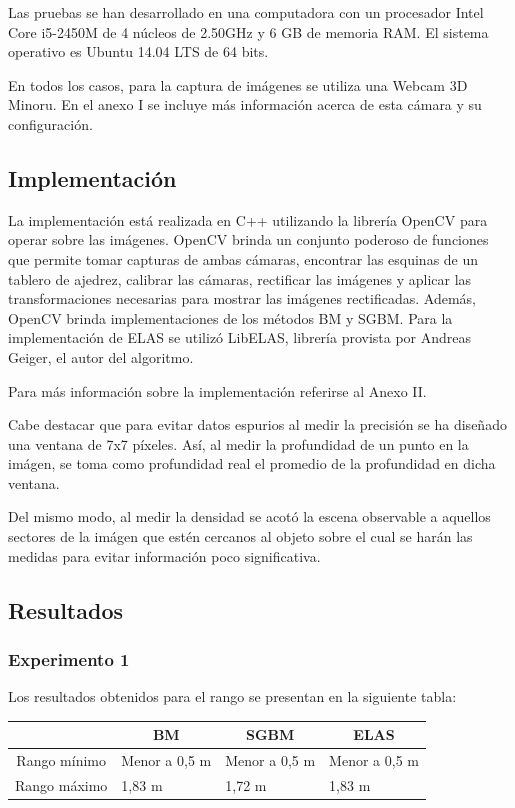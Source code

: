 \documentclass[11pt,a4paper,titlepage]{article}
\begin{document}
Las pruebas se han desarrollado en una computadora con un procesador Intel Core i5-2450M de 4 núcleos de 2.50GHz y 6 GB de memoria RAM. El sistema operativo es Ubuntu 14.04 LTS de 64 bits.

En todos los casos, para la captura de imágenes se utiliza una Webcam 3D Minoru. En el anexo I se incluye más información acerca de esta cámara y su configuración.

\subsection{Implementación}

La implementación está realizada en C++ utilizando la librería OpenCV para operar sobre las imágenes. OpenCV brinda un conjunto poderoso de funciones que permite tomar capturas de ambas cámaras, encontrar las esquinas de un tablero de ajedrez, calibrar las cámaras, rectificar las imágenes y aplicar las transformaciones necesarias para mostrar las imágenes rectificadas. Además, OpenCV brinda implementaciones de los métodos BM y SGBM. Para la implementación de ELAS se utilizó LibELAS, librería provista por Andreas Geiger, el autor del algoritmo.

Para más información sobre la implementación referirse al Anexo II.

Cabe destacar que para evitar datos espurios al medir la precisión se ha diseñado una ventana de 7x7 píxeles. Así, al medir la profundidad de un punto en la imágen, se toma como profundidad real el promedio de la profundidad en dicha ventana.

Del mismo modo, al medir la densidad se acotó la escena observable a aquellos sectores de la imágen que estén cercanos al objeto sobre el cual se harán las medidas para evitar información poco significativa.

\subsection{Resultados}

\subsubsection{Experimento 1}

Los resultados obtenidos para el rango se presentan en la siguiente tabla:

\begin{table}[!ht]
\centering
\begin{tabular}{@{}clll@{}}
       & \multicolumn{1}{c}{BM} & \multicolumn{1}{c}{SGBM} & \multicolumn{1}{c}{ELAS} \\ \midrule
Rango mínimo & Menor a 0,5 m & Menor a 0,5 m & Menor a 0,5 m \\ \midrule
Rango máximo & 1,83 m & 1,72 m & 1,83 m \\ \midrule
\end{tabular}
\end{table}
\end{document}
